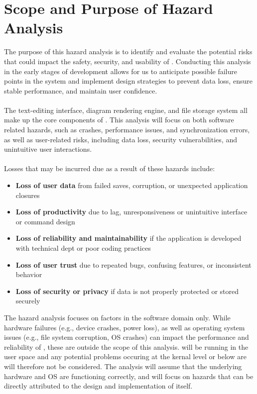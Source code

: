 \documentclass{article}
\begin{document}
\section{Scope and Purpose of Hazard Analysis}

The purpose of this hazard analysis is to identify and evaluate the potential 
risks that could impact the safety, security, and usability of \progname. 
Conducting this analysis in the early stages of development allows for us to 
anticipate possible failure points in the system and implement design strategies
to prevent data loss, ensure stable performance, and maintain user confidence.
\\
\\
The text-editing interface, diagram rendering engine, and file storage system all 
make up the core components of \progname. This analysis will focus on both 
software related hazards, such as crashes, performance issues, and 
synchronization errors, as well as user-related risks, including data loss, 
security vulnerabilities, and unintuitive user interactions.
\\
\\
Losses that may be incurred due as a result of these hazards include:
\begin{itemize}
    \item \textbf{Loss of user data} from failed saves, corruption, or unexpected
    application closures
    \item \textbf{Loss of productivity} due to lag, unresponsiveness or
    unintuitive interface or command design
    \item \textbf{Loss of reliability and maintainability} if the application 
    is developed with technical dept or poor coding practices
    \item \textbf{Loss of user trust} due to repeated bugs, confusing features,
    or inconsistent behavior
    \item \textbf{Loss of security or privacy} if data is not properly protected
    or stored securely
\end{itemize}

The hazard analysis focuses on factors in the software domain only. While
hardware failures (e.g., device crashes, power loss), as well as operating
system issues (e.g., file system corruption, OS crashes) can impact the
performance and reliability of \progname, these are outside the scope of this
analysis. \progname will be running in the user space and any potential
problems occuring at the kernal level or below are will therefore not be 
considered. The analysis will assume that the underlying hardware and OS
are functioning correctly, and will focus on hazards that can be directly
attributed to the design and implementation of \progname itself.
\end{document}

